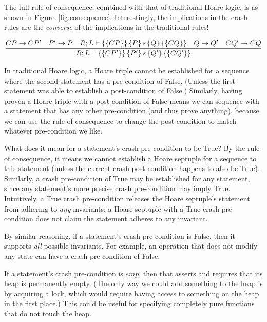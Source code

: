 The full rule of consequence, combined with that of traditional Hoare logic, is
as shown in Figure~\ref{fig:consequence}.
Interestingly, the implications in
the crash rules are the \textit{converse} of the implications in the traditional
rules!

\begin{figure*}
\begin{gather*}
\infer{\hoarestmt{R}{L}{CP'}{P'}{s}{Q'}{CQ'}}
      {CP \imp CP' & P' \imp P & \hoarestmt{R}{L}{CP}{P}{s}{Q}{CQ}
      & Q \imp Q' & CQ' \imp CQ}
\end{gather*}
\caption{Rule of Consequence}
\label{fig:consequence}
\end{figure*}

In traditional Hoare logic, a Hoare triple cannot be established for a sequence
where the second statement has a pre-condition of False.
(Unless the first
statement was able to establish a post-condition of False.)
Similarly, having
proven a Hoare triple with a post-condition of False means we can sequence with
a statement that has any other pre-condition (and thus prove anything), because
we can use the rule of consequence to change the post-condition to match
whatever pre-condition we like.

What does it mean for a statement's crash pre-condition to be True? By the rule
of consequence, it means we cannot establish a Hoare septuple for a sequence
to this statement (unless the current crash post-condition happens to also be
True).
Similarly, a crash pre-condition of True may be established for any
statement, since any statement's more precise crash pre-condition may imply
True.
Intuitively, a True crash pre-condition releases the Hoare septuple's
statement from adhering to \textit{any} invariants; a Hoare septuple with a
True crash pre-condition does not claim the statement adheres to any invariant.

By similar reasoning, if a statement's crash pre-condition is False, then it
supports \textit{all} possible invariants.
For example, an operation that does
not modify any state can have a crash pre-condition of False.

If a statement's crash pre-condition is $\mathit{emp}$, then that asserts and requires
that its heap is permanently empty.
(The only way we could add something to the
heap is by acquiring a lock, which would require having access to something on
the heap in the first place.)
This could be useful for specifying completely
pure functions that do not touch the heap.

